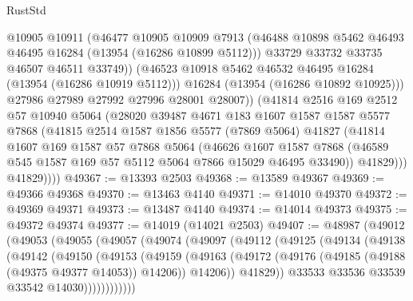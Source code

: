 \begin{lexlean}{RustStd}
\begin{coremodule}
                  @10905
                  @10911
                  (@46477
                    @10905
                    @10909
                    @7913
                    (@46488 @10898 @5462 @46493 @46495 @16284 (@13954 (@16286 @10899 @5112)))
                    @33729
                    @33732
                    @33735
                    @46507
                    @46511
                    @33749))
                (@46523 @10918 @5462 @46532 @46495 @16284 (@13954 (@16286 @10919 @5112)))
                @16284
                (@13954 (@16286 @10892 @10925)))
              @27986
              @27989
              @27992
              @27996
              @28001
              @28007))
          (@41814
            @2516
            @169
            @2512
            @57
            @10940
            @5064
            (@28020
              @39487
              @4671
              @183
              @1607
              @1587
              @1587
              @5577
              @7868
              (@41815
                @2514
                @1587
                @1856
                @5577
                (@7869 @5064)
                @41827
                (@41814
                  @1607
                  @169
                  @1587
                  @57
                  @7868
                  @5064
                  (@46626
                    @1607
                    @1587
                    @7868
                    (@46589 @545 @1587 @169 @57 @5112 @5064 @7866 @15029 @46495 @33490))
                  @41829)))
            @41829))))
@49367 := @13393 @2503
@49368 := @13589 @49367
@49369 := @49366 @49368
@49370 := @13463 @4140
@49371 := @14010 @49370
@49372 := @49369 @49371
@49373 := @13487 @4140
@49374 := @14014 @49373
@49375 := @49372 @49374
@49377 := @14019 (@14021 @2503)
@49407 := @48987
    (@49012
      (@49053
        (@49055
          (@49057
            (@49074
              (@49097
                (@49112
                  (@49125
                    (@49134
                      (@49138
                        (@49142
                          (@49150
                            (@49153
                              (@49159
                                (@49163
                                  (@49172
                                    (@49176 (@49185 (@49188 (@49375 @49377 @14053)) @14206))
                                    @14206))
                                @41829))
                            @33533
                            @33536
                            @33539
                            @33542
                            @14030))))))))))))

\end{coremodule}
\end{lexlean}
